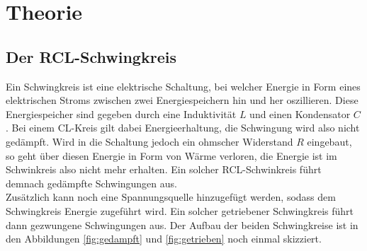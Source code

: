 \section{Theorie}
\label{sec:Theorie}
\subsection{Der RCL-Schwingkreis}
\label{sec:RCL}
Ein Schwingkreis ist eine elektrische Schaltung, bei welcher Energie in Form eines elektrischen Stroms zwischen zwei Energiespeichern hin
und her oszillieren. Diese Energiespeicher sind gegeben durch eine Induktivität $L$ und einen Kondensator $C$. Bei einem CL-Kreis gilt dabei
Energieerhaltung, die Schwingung wird also nicht gedämpft. Wird in die Schaltung jedoch ein ohmscher Widerstand $R$ eingebaut, so geht über
diesen Energie in Form von Wärme verloren, die Energie ist im Schwinkreis also nicht mehr erhalten. Ein solcher RCL-Schwinkreis führt demnach
gedämpfte Schwingungen aus.\\\noindent
Zusätzlich kann noch eine Spannungsquelle hinzugefügt werden, sodass dem Schwingkreis Energie zugeführt wird. Ein solcher getriebener
Schwingkreis führt dann gezwungene Schwingungen aus. Der Aufbau der beiden Schwingkreise ist in den Abbildungen \ref{fig:gedampft} und
\ref{fig:getrieben} noch einmal skizziert.
